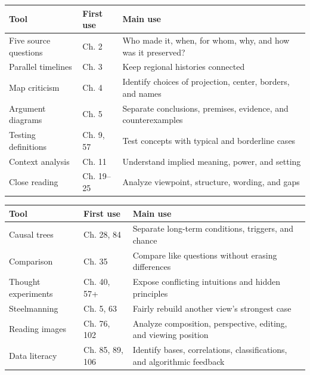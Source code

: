 \noindent
\begin{tabularx}{\linewidth}{llX}
\toprule
Tool & First use & Main use \\
\midrule
Five source questions & Ch. 2 & Who made it, when, for whom, why, and how was it preserved? \\
Parallel timelines & Ch. 3 & Keep regional histories connected \\
Map criticism & Ch. 4 & Identify choices of projection, center, borders, and names \\
Argument diagrams & Ch. 5 & Separate conclusions, premises, evidence, and counterexamples \\
Testing definitions & Ch. 9, 57 & Test concepts with typical and borderline cases \\
Context analysis & Ch. 11 & Understand implied meaning, power, and setting \\
Close reading & Ch. 19--25 & Analyze viewpoint, structure, wording, and gaps \\
\bottomrule
\end{tabularx}

\noindent
\begin{tabularx}{\linewidth}{llX}
\toprule
Tool & First use & Main use \\
\midrule
Causal trees & Ch. 28, 84 & Separate long-term conditions, triggers, and chance \\
Comparison & Ch. 35 & Compare like questions without erasing differences \\
Thought experiments & Ch. 40, 57+ & Expose conflicting intuitions and hidden principles \\
Steelmanning & Ch. 5, 63 & Fairly rebuild another view's strongest case \\
Reading images & Ch. 76, 102 & Analyze composition, perspective, editing, and viewing position \\
Data literacy & Ch. 85, 89, 106 & Identify bases, correlations, classifications, and algorithmic feedback \\
\bottomrule
\end{tabularx}
